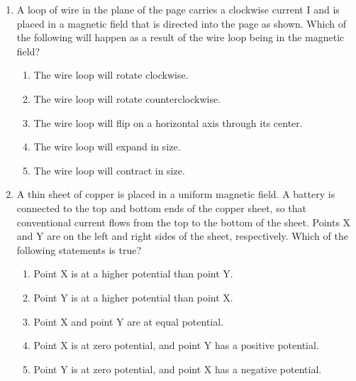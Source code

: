 \documentclass{../../oss-apphys}
\begin{document}
\begin{multicols}{2}
\begin{enumerate}[leftmargin=18pt,resume]
  \item A loop of wire in the plane of the page carries a clockwise current I
    and is placed in a magnetic field that is directed into the page as shown.
    Which of the following will happen as a result of the wire loop being in
    the magnetic field?
    \begin{center}
    \end{center}
    \begin{enumerate}[noitemsep,topsep=0pt,leftmargin=18pt,label=(\Alph*)]
    \item The wire loop will rotate clockwise.
    \item The wire loop will rotate counterclockwise.
    \item The wire loop will flip on a horizontal axis through its center.
    \item The wire loop will expand in size.
    \item The wire loop will contract in size.
    \end{enumerate}
    \columnbreak
    
  \item A thin sheet of copper is placed in a uniform magnetic field. A battery
    is connected to the top and bottom ends of the copper sheet, so that
    conventional current flows from the top to the bottom of the sheet.
    Points X and Y are on the left and right sides of the sheet, respectively.
    Which of the following statements is true?
    \begin{center}
    \end{center}
    \begin{enumerate}[noitemsep,topsep=0pt,leftmargin=18pt,label=(\Alph*)]
    \item Point X is at a higher potential than point Y.
    \item Point Y is at a higher potential than point X.
    \item Point X and point Y are at equal potential.
    \item Point X is at zero potential, and point Y has a positive potential.
    \item Point Y is at zero potential, and point X has a negative potential.
    \end{enumerate}


\end{enumerate}
\end{multicols}
\end{document}
